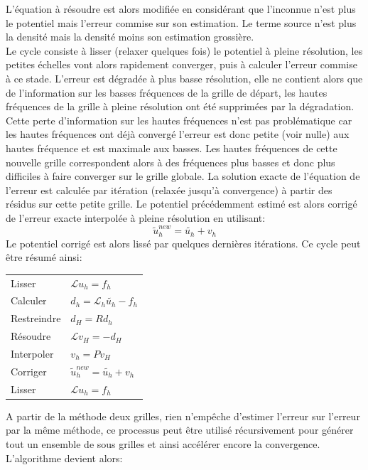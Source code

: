 L'équation à résoudre est alors modifiée en considérant que l'inconnue n'est plus le potentiel mais l'erreur commise sur son estimation. Le terme source n'est plus la densité mais la densité moins son estimation grossière.\\

Le cycle consiste à lisser (relaxer quelques fois) le potentiel à pleine résolution, les petites échelles vont alors rapidement converger, puis à calculer l'erreur commise à ce stade. 
L'erreur est dégradée à plus basse résolution, elle ne contient alors que de l'information sur les basses fréquences de la grille de départ, les hautes fréquences de la grille à pleine résolution ont été supprimées par la dégradation. 
Cette perte d'information sur les hautes fréquences n'est pas problématique car les hautes fréquences ont déjà convergé l'erreur est donc petite (voir nulle) aux hautes fréquence et est maximale aux basses. 
Les hautes fréquences de cette nouvelle grille correspondent alors à des fréquences plus basses et donc plus difficiles à faire converger sur le grille globale. 
La solution exacte de l'équation de l'erreur est calculée par itération (relaxée jusqu'à convergence) à partir des résidus sur cette petite grille. 
Le potentiel précédemment estimé est alors corrigé de l'erreur exacte interpolée à pleine résolution en utilisant:
\[ \tilde{u}_h^{new} = \tilde{u_h} + v_h \]
Le potentiel corrigé est alors lissé par quelques dernières itérations.
Ce cycle peut être résumé ainsi:

\begin{tabular}{ll}
Lisser 		& 	$ \mathcal{L} u_h = f_h $\\
Calculer	&	$ d_h = \mathcal{L}_h \tilde{u_h} - f_h $\\
Restreindre	&	$ d_H = Rd_h$\\
Résoudre	&	$ \mathcal{L} v_H = -d_H $\\
Interpoler	&	$ v_h = Pv_H$\\
Corriger	&	$ \tilde{u}_h^{new} = \tilde{u_h} + v_h$\\
Lisser		&	$ \mathcal{L} u_h = f_h $
\end{tabular} 

A partir de la méthode deux grilles, rien n'empêche d'estimer l'erreur sur l'erreur par la même méthode, ce processus peut être utilisé récursivement pour générer tout un ensemble de sous grilles et ainsi accélérer encore la convergence.\\

L'algorithme devient alors:\\

